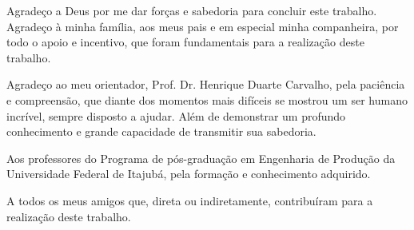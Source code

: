 Agradeço a Deus por me dar forças e sabedoria para concluir este trabalho. Agradeço à minha família, aos meus pais e em especial minha companheira, por todo o apoio e incentivo, que foram fundamentais para a realização deste trabalho. 

Agradeço ao meu orientador, Prof. Dr. Henrique Duarte Carvalho, pela paciência e compreensão, que diante dos momentos mais difíceis se mostrou um ser humano incrível, sempre disposto a ajudar. Além de demonstrar um profundo conhecimento e grande capacidade de transmitir sua sabedoria.

Aos professores do Programa de pós-graduação em Engenharia de Produção da Universidade Federal de Itajubá, pela formação e conhecimento adquirido.

A todos os meus amigos que, direta ou indiretamente, contribuíram para a realização deste trabalho.